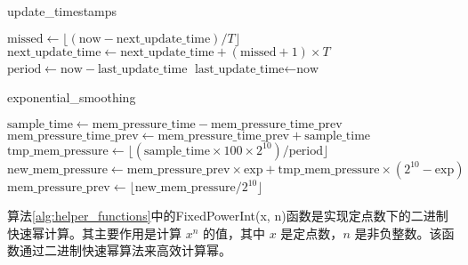 \begin{algorithm}[H]
\caption{update\_timestamps}
\label{alg:update_timestamps}
\SetAlgoLined
\DontPrintSemicolon
{}
\(\text{missed} \gets \lfloor(\text{now}-\text{next\_update\_time})/T\rfloor\)\;
\(\text{next\_update\_time} \gets \text{next\_update\_time} + (\text{missed}+1) \times T\)\;
\(\text{period}\gets \text{now}-\text{last\_update\_time}\)\;
 \(\text{last\_update\_time}\gets \text{now}\)\;
\end{algorithm}

\begin{algorithm}[H]
\caption{exponential\_smoothing}
\label{alg:exponential_smoothing}
\SetAlgoLined
\DontPrintSemicolon
{}

\(\text{sample\_time}\gets \text{mem\_pressure\_time}-\text{mem\_pressure\_time\_prev}\)\;
    \(\text{mem\_pressure\_time\_prev} \gets \text{mem\_pressure\_time\_prev} + \text{sample\_time}\)\;
    \(\text{tmp\_mem\_pressure}\gets \lfloor(\text{sample\_time}\times 100\times 2^{10})/\text{period}\rfloor\)\;
    \(\text{new\_mem\_pressure}\gets \text{mem\_pressure\_prev}\times \text{exp} + \text{tmp\_mem\_pressure}\times(2^{10}-\text{exp})\)\;
    \(\text{mem\_pressure\_prev}\gets \lfloor \text{new\_mem\_pressure}/2^{10}\rfloor\)\;
\end{algorithm}



算法\ref{alg:helper_functions}中的FixedPowerInt(x, n)函数是实现定点数下的二进制快速幂计算。其主要作用是计算 \(x^n\) 的值，其中 \(x\) 是定点数，\(n\) 是非负整数。该函数通过二进制快速幂算法来高效计算幂。

